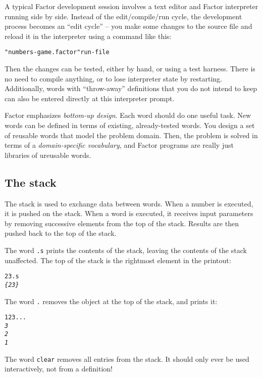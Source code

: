 \documentclass[english]{article}
\begin{document}
A typical Factor development session involves a text editor and Factor
interpreter running side by side. Instead of the edit/compile/run
cycle, the development process becomes an {}``edit cycle'' -- you
make some changes to the source file and reload it in the interpreter
using a command like this:

\begin{alltt}
"numbers-game.factor" run-file
\end{alltt}

Then the changes can be tested, either by hand, or using a test harness.
There is no need to compile anything, or to lose interpreter state
by restarting. Additionally, words with {}``throw-away'' definitions
that you do not intend to keep can also be entered directly at this
interpreter prompt.

Factor emphasizes \emph{bottom-up design}. Each word should do one useful task. New words can be defined in terms
of existing, already-tested words. You design a set of reusable words
that model the problem domain. Then, the problem is solved in terms
of a \emph{domain-specific vocabulary}, and Factor programs are really just libraries of ureusable words.

\subsection{The stack}

The stack is used to exchange data between words. When a number is
executed, it is pushed on the stack. When a word is executed, it receives
input parameters by removing successive elements from the top of the
stack. Results are then pushed back to the top of the stack. 

The word \texttt{.s} prints the contents of the stack, leaving the
contents of the stack unaffected. The top of the stack is the rightmost
element in the printout:

\begin{alltt}
2 3 .s
\emph{\{ 2 3 \}}
\end{alltt}

The word \texttt{.} removes the object at the top of the stack, and
prints it:

\begin{alltt}
1 2 3 . . .
\emph{3}
\emph{2}
\emph{1}
\end{alltt}

The word \texttt{clear} removes all entries from the stack. It should only ever be used interactively, not from a definition!
\end{document}
